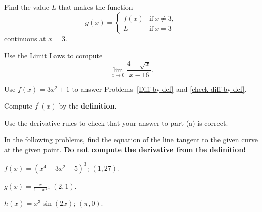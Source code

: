 \documentclass[12pt]{amsart}
\begin{document}
\vspace{2in}

\begin{thm}[3 Points]\label{fix discont}
    Find the value \(L\) that makes the function
    \[g(x) = \left\{\begin{matrix}
    f(x) & \text{if}\ x \neq 3,\\
    L & \text{if}\ x = 3
    \end{matrix}
    \right.\]
    continuous at \(x = 3\).
\end{thm}

\newpage

\begin{thm}[10 Points]
  Use the Limit Laws to compute
  \[\lim_{x \to 0} \frac{4 - \sqrt{x}}{x - 16}.\]
\end{thm}

\vspace{3in}

\noindent Use \(f(x) = 3x^2 + 1\) to answer Problems~\ref{Diff by def} and \ref{check diff by def}.

\begin{thm}[10 Points]\label{Diff by def}
  Compute \(f^\prime(x)\) by the \textbf{definition}.
\end{thm}

\vspace{3in}

\begin{thm}[5 Points]\label{check diff by def}
  Use the derivative rules to check that your answer to part (a) is correct.
\end{thm}

\newpage

\noindent In the following problems, find the equation of the line tangent to the given curve at the given point.
\textbf{Do not compute the derivative from the definition!}
\begin{thm}[15 Points]
  \(\displaystyle{f(x) = (x^4 - 3x^2 + 5)^3}\); \((1,27)\).
\end{thm}

\vspace{2in}
\begin{thm}[15 Points]
  \(\displaystyle{g(x) = \frac{x}{1 - x^2}}\); \((2,1)\).
\end{thm}

\vspace{2in}

\begin{thm}[15 Points]
  \(\displaystyle{h(x) = x^3\sin(2x)}\); \((\pi,0)\).
\end{thm}
\end{document}
